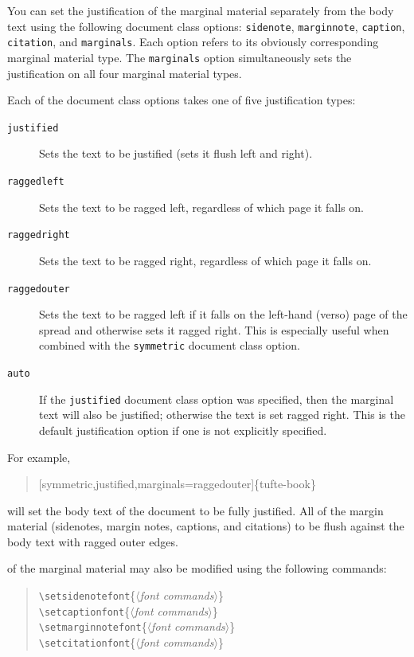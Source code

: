 \documentclass[a4paper]{tufte-handout}
\newcommand{\hlorange}[1]{\textcolor{tufte-orange}{#1}}
\newcommand{\doccmd}[1]{\hlorange{\texttt{\textbackslash#1}}}
\newcommand{\docopt}[1]{\( \langle \)\textrm{\textit{#1}}\( \rangle \)}
\newcommand{\docclsopt}[1]{\hlorange{\texttt{#1}}}
\newenvironment{docspec}
  {\begin{quotation}\ttfamily\parskip0pt\parindent0pt\ignorespaces}
  {\end{quotation}}
\begin{document}
You can set the justification of the marginal material separately from the body text using the following document class options: \docclsopt{sidenote}, \docclsopt{marginnote}, \docclsopt{caption}, \docclsopt{citation}, and \docclsopt{marginals}. 
Each option refers to its obviously corresponding marginal material type. 
The \docclsopt{marginals} option simultaneously sets the justification on all four marginal material types.

Each of the document class options takes one of five justification types:
\begin{description}
  \item[\docclsopt{justified}] Sets the text to be justified (sets it flush left and right).
  \item[\docclsopt{raggedleft}] Sets the text to be ragged left, regardless of which page it falls on.
  \item[\docclsopt{raggedright}] Sets the text to be ragged right, regardless of which page it falls on.
  \item[\docclsopt{raggedouter}] Sets the text to be ragged left if it falls on the left-hand (verso) page of the spread and otherwise sets it ragged right.
  This is especially useful when combined with the \docclsopt{symmetric} document class option.
  \item[\docclsopt{auto}] If the \docclsopt{justified} document class option was specified, then the marginal text will also be justified; otherwise the text is set ragged right. 
  This is the default justification option if one is not explicitly specified.
\end{description}

\noindent For example, 
\begin{docspec}
  [symmetric,justified,marginals=raggedouter]\{tufte-book\}
\end{docspec}
will set the body text of the document to be fully justified.
All of the margin material (sidenotes, margin notes, captions, and citations) to be flush against the body text with ragged outer edges.

 of the marginal material may also be modified using the following commands:

\begin{docspec}
  \doccmd{setsidenotefont}\{\docopt{font commands}\} \\
  \doccmd{setcaptionfont}\{\docopt{font commands}\} \\
  \doccmd{setmarginnotefont}\{\docopt{font commands}\} \\
  \doccmd{setcitationfont}\{\docopt{font commands}\}
\end{docspec}
\end{document}
